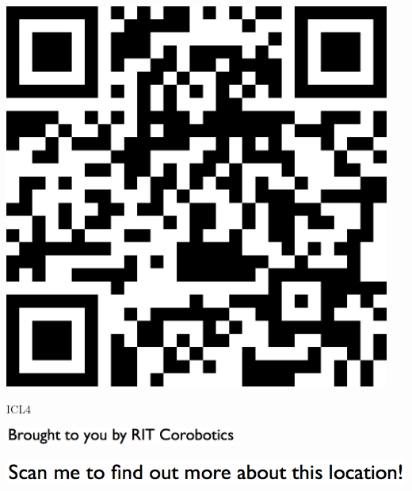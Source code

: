 \documentclass[letterpaper]{article}
\begin{document}
 \begingroup 
 \centerline{\includegraphics[scale=1,width=5in,height=5in]{ICL4.png}} 
 \endgroup 
 \vspace*{\fill} 

 \hfill{\small ICL4} 

  \vspace{0.7in} 
 
 \centerline{\includegraphics[scale=1,width=3in]{text-bottom.png}} 
 
 \pagebreak 
{} 
 \vspace*{\fill} 
 
  \centerline{\includegraphics[scale=1,width=6in]{text-top.png}} 
 
 \vspace{0.5in} 
 
\end{document}
